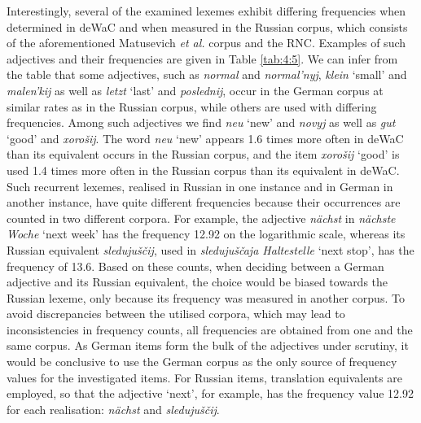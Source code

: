 Interestingly, several of the examined lexemes exhibit differing frequencies when determined in deWaC and when measured in the Russian corpus, which consists of the aforementioned Matusevich \textit{et al.} corpus and the RNC. Examples of such adjectives and their frequencies are given in Table \ref{tab:4:5}. We can infer from the table that some adjectives, such as \textit{normal} and \textit{normal'nyj}, \textit{klein} `small' and \textit{malen'kij} as well as \textit{letzt} `last' and \textit{poslednij}, occur in the German corpus at similar rates as in the Russian corpus, while others are used with differing frequencies. Among such adjectives we find  \textit{neu} `new' and \textit{novyj} as well as \textit{gut} `good' and \textit{xorošij}. The word \textit{neu} `new' appears 1.6 times more often in deWaC than its equivalent occurs in the Russian corpus, and the item \textit{xorošij} `good' is used 1.4 times more often in the Russian corpus than its equivalent in deWaC. Such recurrent lexemes, realised in Russian in one instance and in German in another instance, have quite different frequencies because their occurrences are counted in two different corpora. For example, the adjective \textit{nächst} in \textit{nächste Woche} `next week' has the frequency 12.92 on the logarithmic scale, whereas its Russian equivalent \textit{sledujuščij}, used in \textit{sledujuščaja Haltestelle} `next stop', has the frequency of 13.6. Based on these counts, when deciding between a German adjective and its Russian equivalent, the choice would be biased towards the Russian lexeme, only because its frequency was measured in another corpus. To avoid discrepancies between the utilised corpora, which may lead to inconsistencies in frequency counts, all frequencies are obtained from one and the same corpus. As German items form the bulk of the adjectives under scrutiny, it would be conclusive to use the German corpus as the only source of frequency values for the investigated items. For Russian items, translation equivalents are employed, so that the adjective `next', for example, has the frequency value 12.92 for each realisation: \textit{nächst} and \textit{sledujuščij}.

